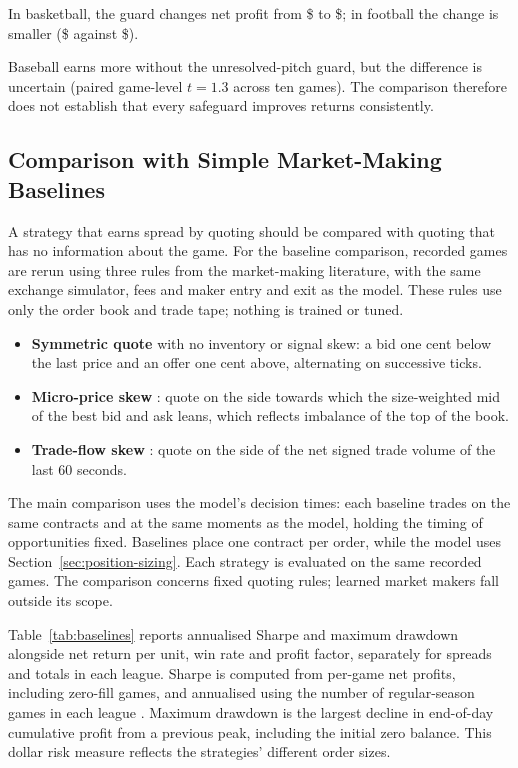 \documentclass[12pt,a4paper,oneside]{report}
\begin{document}


In basketball, the guard changes net profit from
\$\resguardNBAGuardoffnet{} to \$\resguardNBAGuardonnet{}; in football the
change is smaller (\$\resguardNFLGuardoffnet{} against
\$\resguardNFLGuardonnet{}).

Baseball earns more without the unresolved-pitch guard, but the difference is
uncertain (paired game-level $t=1.3$ across ten games). The comparison therefore
does not establish that every safeguard improves returns consistently.

\subsection{Comparison with Simple Market-Making Baselines}
A strategy that earns spread by quoting should be compared with quoting that has no information about the game.
For the baseline comparison, recorded games are rerun using three rules from
the market-making literature, with the same exchange simulator, fees and maker
entry and exit as the model. These rules use only the order book and trade
tape; nothing is trained or tuned.
\begin{itemize}
  \item \textbf{Symmetric quote} \citep{avellaneda2008high} with no inventory or signal skew:
        a bid one cent below the last price and an offer one cent above, alternating on successive ticks.
  \item \textbf{Micro-price skew} \citep{stoikov2018micro}: quote on the side towards which the
        size-weighted mid of the best bid and ask leans, which reflects imbalance of the top of the book.
  \item \textbf{Trade-flow skew} \citep{cont2014price}: quote on the side of the net signed trade volume of the last 60 seconds.
\end{itemize}
The main comparison uses the model's decision times: each baseline trades on
the same contracts and at the same moments as the model, holding the timing
of opportunities fixed. Baselines place one contract per order, while the
model uses Section~\ref{sec:position-sizing}. Each strategy is evaluated on the
same recorded games. The comparison concerns fixed quoting rules; learned
market makers \citep{spooner2018market} fall outside its scope.

Table~\ref{tab:baselines} reports annualised Sharpe and maximum drawdown
alongside net return per unit, win rate and profit factor, separately for
spreads and totals in each league.
Sharpe is computed from per-game net profits, including zero-fill games, and
annualised using the number of regular-season games in each league
\citep{sharpe1994ratio}. Maximum drawdown is the largest decline in end-of-day
cumulative profit from a previous peak, including the initial zero balance.
This dollar risk measure reflects the strategies' different order sizes.
\end{document}
